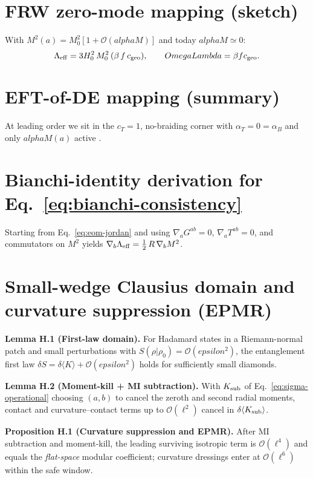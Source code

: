 \documentclass[aps,prd,onecolumn,superscriptaddress,nofootinbib]{revtex4-2}
\def\OmL{OmegaLambda}%
\def\alphaM{alphaM}%
\def\eps{epsilon}%
\newcommand{\OmL}{\Omega_\Lambda}
\newcommand{\alphaM}{\alpha_M}
\newcommand{\eps}{\varepsilon}
\begin{document}
\section{FRW zero-mode mapping (sketch)}
\label{app:frw-mapping}
With $M^2(a)=M_0^2[1+\mathcal O(\alphaM)]$ and today $\alphaM\simeq 0$:
\begin{equation}
\Lambda_{\rm eff} = 3 H_0^2 \,M_0^2 \,(\beta\, f\, c_{\rm geo}),\qquad
\OmL=\beta f c_{\rm geo}.
\end{equation}

\section{EFT-of-DE mapping (summary)}
\label{app:eft}
At leading order we sit in the $c_T=1$, no-braiding corner with $\alpha_T=0=\alpha_B$ and only $\alphaM(a)$ active \cite{BelliniSawicki2014}.

\section{Bianchi-identity derivation for Eq.\ \eqref{eq:bianchi-consistency}}
\label{app:bianchi-derivation}
Starting from Eq.\ \eqref{eq:eom-jordan} and using $\nabla_a G^{ab}=0$, $\nabla_a T^{ab}=0$, and commutators on $M^2$ yields $\nabla_b \Lambda_{\rm eff} = \tfrac12\, R\,\nabla_b M^2$.

\section{Small-wedge Clausius domain and curvature suppression (EPMR)}
\label{app:epmr}
\noindent\textbf{Lemma H.1 (First-law domain).}
For Hadamard states in a Riemann-normal patch and small perturbations with $S(\rho|\rho_0)=\mathcal O(\eps^2)$, the entanglement first law
$\delta S=\delta\langle K\rangle+\mathcal O(\eps^2)$
holds for sufficiently small diamonds.

\medskip
\noindent\textbf{Lemma H.2 (Moment-kill + MI subtraction).}
With $K_{\rm sub}$ of Eq.~\eqref{eq:sigma-operational} choosing $(a,b)$ to cancel the zeroth and second radial moments, contact and curvature--contact terms up to $\mathcal O(\ell^2)$ cancel in $\delta\langle K_{\rm sub}\rangle$.

\medskip
\noindent\textbf{Proposition H.1 (Curvature suppression and EPMR).}
After MI subtraction and moment-kill, the leading surviving isotropic term is $\mathcal O(\ell^4)$ and equals the \emph{flat-space} modular coefficient; curvature dressings enter at $\mathcal O(\ell^6)$ within the safe window.
\end{document}
